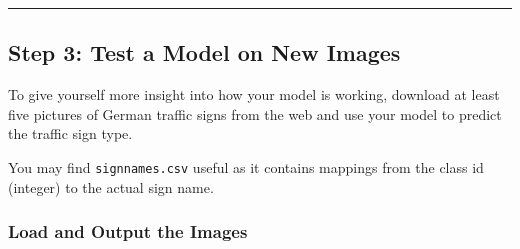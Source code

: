 \documentclass[11pt]{article}
\begin{document}
    \begin{center}\rule{0.5\linewidth}{\linethickness}\end{center}

\hypertarget{step-3-test-a-model-on-new-images}{%
\subsection{Step 3: Test a Model on New
Images}\label{step-3-test-a-model-on-new-images}}

To give yourself more insight into how your model is working, download
at least five pictures of German traffic signs from the web and use your
model to predict the traffic sign type.

You may find \texttt{signnames.csv} useful as it contains mappings from
the class id (integer) to the actual sign name.

    \hypertarget{load-and-output-the-images}{%
\subsubsection{Load and Output the
Images}\label{load-and-output-the-images}}
\end{document}
